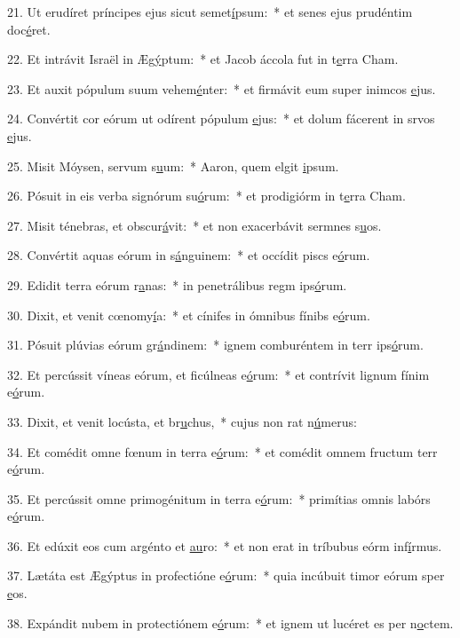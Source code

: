 21. Ut erudíret príncipes ejus sicut semet\uline{í}psum:~* et senes ejus prudéntim doc\uline{é}ret.\par 
22. Et intrávit Israël in Æg\uline{ý}ptum:~* et Jacob áccola fut in t\uline{e}rra Cham.\par 
23. Et auxit pópulum suum vehem\uline{é}nter:~* et firmávit eum super inimcos \uline{e}jus.\par 
24. Convértit cor eórum ut odírent pópulum \uline{e}jus:~* et dolum fácerent in srvos \uline{e}jus.\par 
25. Misit Móysen, servum s\uline{u}um:~* Aaron, quem elgit \uline{i}psum.\par 
26. Pósuit in eis verba signórum su\uline{ó}rum:~* et prodigiórm in t\uline{e}rra Cham.\par 
27. Misit ténebras, et obscur\uline{á}vit:~* et non exacerbávit sermnes s\uline{u}os.\par 
28. Convértit aquas eórum in s\uline{á}nguinem:~* et occídit piscs e\uline{ó}rum.\par 
29. Edidit terra eórum r\uline{a}nas:~* in penetrálibus regm ips\uline{ó}rum.\par 
30. Dixit, et venit cœnomy\uline{í}a:~* et cínifes in ómnibus fínibs e\uline{ó}rum.\par 
31. Pósuit plúvias eórum gr\uline{á}ndinem:~* ignem comburéntem in terr ips\uline{ó}rum.\par 
32. Et percússit víneas eórum, et ficúlneas e\uline{ó}rum:~* et contrívit lignum fínim e\uline{ó}rum.\par 
33. Dixit, et venit locústa, et br\uline{u}chus,~* cujus non rat n\uline{ú}merus:\par 
34. Et comédit omne fœnum in terra e\uline{ó}rum:~* et comédit omnem fructum terr e\uline{ó}rum.\par 
35. Et percússit omne primogénitum in terra e\uline{ó}rum:~* primítias omnis labórs e\uline{ó}rum.\par 
36. Et edúxit eos cum argénto et \uline{au}ro:~* et non erat in tríbubus eórm inf\uline{í}rmus.\par 
37. Lætáta est Ægýptus in profectióne e\uline{ó}rum:~* quia incúbuit timor eórum sper \uline{e}os.\par 
38. Expándit nubem in protectiónem e\uline{ó}rum:~* et ignem ut lucéret es per n\uline{o}ctem.\par 
